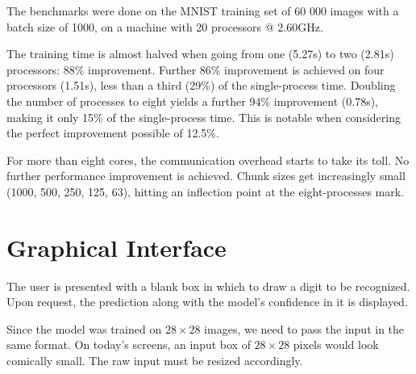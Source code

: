 \documentclass[a4paper]{article}
\begin{document}
\begin{center}
\end{center}

\noindent The benchmarks were done on the MNIST training set of 60 000 images with a batch size of 1000, on a machine with 20 processors @ 2.60GHz.

The training time is almost halved when going from one (5.27s) to two (2.81s) processors: 88\% improvement. Further 86\% improvement is achieved on four processors (1.51s), less than a third (29\%) of the single-process time. Doubling the number of processes to eight yields a further 94\% improvement (0.78s), making it only 15\% of the single-process time. This is notable when considering the perfect improvement possible of 12.5\%. 

For more than eight cores, the communication overhead starts to take its toll. No further performance improvement is achieved. Chunk sizes get increasingly small (1000, 500, 250, 125, 63), hitting an inflection point at the eight-processes mark.


\newpage
\section{Graphical Interface}
The user is presented with a blank box in which to draw a digit to be recognized. Upon request, the prediction along with the model's confidence in it is displayed. 


\noindent Since the model was trained on $28 \times 28$ images, we need to pass the input in the same format. On today's screens, an input box of $28 \times 28$ pixels would look comically small. The raw input must be resized accordingly.
\end{document}
